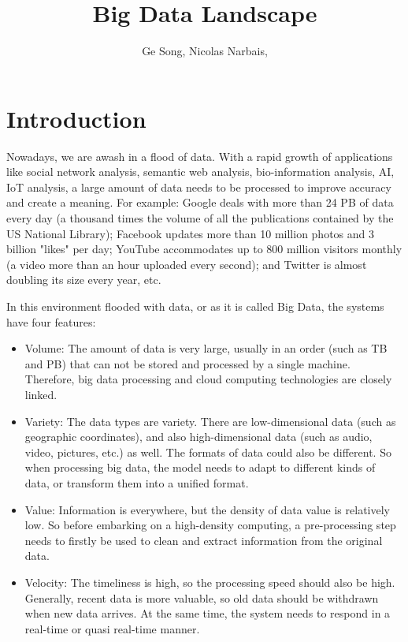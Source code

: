 \documentclass[	DIV=calc,%
							paper=a4,%
							fontsize=11pt,%
							twocolumn]{scrartcl}	 					%
\title{Big Data Landscape}					%
\author{Ge Song, Nicolas Narbais, }											%
\date{}																				%
\newcommand{\initial}[1]{%
     \lettrine[lines=3,lhang=0.3,nindent=0em]{
     				\color{DarkBlue}
     				{\textsf{#1}}}{}}
\begin{document}
\maketitle
\thispagestyle{fancy} 			%


\section*{\color{DarkOrange}Introduction}
Nowadays, we are awash in a flood of data. With a rapid growth of applications like social network analysis, semantic web analysis, bio-information analysis, AI, IoT analysis, a large amount of data needs to be processed to improve accuracy and create a meaning. For example: Google deals with more than 24 PB of data every day (a thousand times the volume of all the publications contained by the US National Library); Facebook updates more than 10 million photos and 3 billion "likes" per day; YouTube accommodates up to 800 million visitors monthly (a video more than an hour uploaded every second); and Twitter is almost doubling its size every year, etc.

In this environment flooded with data, or as it is called Big Data, the systems have four features:

\begin{itemize}

\item Volume: The amount of data is very large, usually in an order (such as TB and PB) that can not be stored and processed by a single machine. Therefore, big data processing and cloud computing technologies are closely linked.

\item Variety: The data types are variety. There are low-dimensional data (such as geographic coordinates), and also high-dimensional data (such as audio, video, pictures, etc.) as well. The formats of data could also be different. So when processing big data, the model needs to adapt to different kinds of data, or transform them into a unified format.

\item Value: Information is everywhere, but the density of data value is relatively low. So before embarking on a high-density computing, a pre-processing step needs to firstly be used to clean and extract information from the original data.

\item Velocity: The timeliness is high, so the processing speed should also be high. Generally, recent data is more valuable, so old data should be withdrawn when new data arrives. At the same time, the system needs to respond in a real-time or quasi real-time manner. 

\end{itemize}
\end{document}
